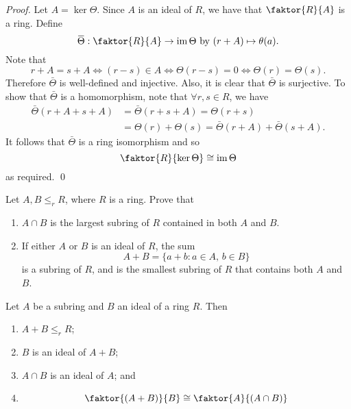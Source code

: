 \begin{proof}
  Let $A = \ker \Theta$. Since $A$ is an ideal of $R$, we have that $\faktor{R}{A}$ is a ring. Define 
  \begin{equation*}
    \bar{\Theta} : \faktor{R}{A} \to \img \Theta \text{ by } ( r + A ) \mapsto \theta(a).
  \end{equation*}
  Note that
  \begin{equation*}
    r + A = s + A \iff (r - s) \in A \iff \Theta(r - s) = 0 \iff \Theta(r) = \Theta(s).
  \end{equation*}
  Therefore $\bar{\Theta}$ is well-defined and injective. Also, it is clear that $\bar{\Theta}$ is surjective. To show that $\bar{\Theta}$ is a homomorphism, note that $\forall r, s \in R$, we have
  \begin{align*}
    \bar{\Theta}(r + A + s + A) &= \bar{\Theta}(r + s + A) = \Theta(r + s) \\
                                &= \Theta(r) + \Theta(s) = \bar{\Theta}(r + A) + \bar{\Theta}(s + A).
  \end{align*}
  It follows that $\bar{\Theta}$ is a ring isomorphism and so
  \begin{equation*}
    \faktor{R}{\ker \Theta} \cong \img \Theta
  \end{equation*}
  as required. \qed
\end{proof}

\begin{ex}
  Let $A, B \leq_r R$, where $R$ is a ring. Prove that
  \begin{enumerate}
    \item $A \cap B$ is the largest subring of $R$ contained in both $A$ and $B$.
    \item If either $A$ or $B$ is an ideal of $R$, the sum
      \begin{equation*}
        A + B = \{a + b : a \in A, \, b \in B \}
      \end{equation*}
      is a subring of $R$, and is the smallest subring of $R$ that contains both $A$ and $B$.
  \end{enumerate}
\end{ex}

\begin{thm}
\label{thm:second_isomorphism_theorem_for_rings}
  Let $A$ be a subring and $B$ an ideal of a ring $R$. Then
  \begin{enumerate}
    \item $A + B \leq_r R$;
    \item $B$ is an ideal of $A + B$;
    \item $A \cap B$ is an ideal of $A$; and
    \item 
      \begin{equation*}
        \faktor{(A + B)}{B} \cong \faktor{A}{(A \cap B)}
      \end{equation*}
  \end{enumerate}
\end{thm}


